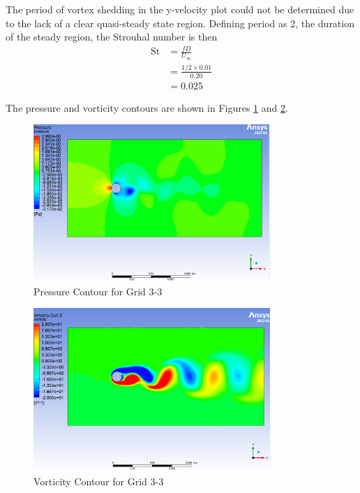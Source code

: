 The period of vortex shedding in the y-velocity plot could not be determined due to the lack of a clear quasi-steady state region. Defining period as 2, the duration of the steady region, the Strouhal number is then
\begin{align*}
    \text{St} &= \frac{fD}{U_\infty} \\
    &= \frac{1/2 \times 0.01}{0.20} \\ 
    &= \boxed{0.025}
\end{align*}

The pressure and vorticity contours are shown in Figures \ref{fig:pressure contour grid 3 3} and \ref{fig:vorticity contour grid 3 3}.
\begin{figure}[H]
    \centering
    \includegraphics[width=0.8\textwidth]{Questions/Figures/pressure contour grid 3 3.png}
    \caption{Pressure Contour for Grid 3-3}
    \label{fig:pressure contour grid 3 3}
\end{figure}
\begin{figure}[H]
    \centering
    \includegraphics[width=0.8\textwidth]{Questions/Figures/vorticity contour grid 3 3.png}
    \caption{Vorticity Contour for Grid 3-3}
    \label{fig:vorticity contour grid 3 3}
\end{figure}

